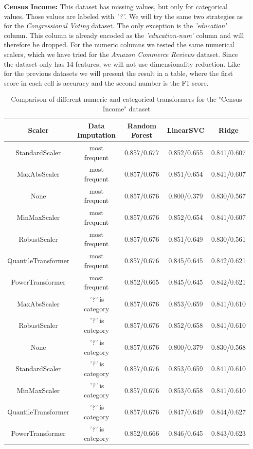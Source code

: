 \documentclass[a4paper,10pt]{article}
\begin{document}
\textbf{Census Income:} This dataset has missing values, but only for categorical values.
 Those values are labeled with \textit{'?'}. We will try the same two strategies as for the \textit{Congressional Voting} dataset.
 The only exception is the \textit{'education'} column. This column is already encoded as the
 \textit{'education-num'} column and will therefore be dropped. For the numeric columns 
 we tested the same numerical scalers, which we have tried for the 
 \textit{Amazon Commerce Reviews} dataset. Since the dataset only has 14 features,
we will not use dimensionality reduction. Like for the previous
datasets we will present the result in a table, where the first score in each cell is accuracy and the second
number is the F1 score.

\begin{table}[h!]
\centering
\small
\begin{tabular}{|c|c|c|c|c|}
\hline
\textbf{Scaler} & \textsf{Data Imputation} & \textbf{Random Forest} & \textbf{LinearSVC} & \textbf{Ridge} \\
\hline
StandardScaler & most frequent & \cellcolor[HTML]{C1E1C1}0.857/0.677 & 0.852/0.655 & 0.841/0.607 \\
\hline
MaxAbsScaler & most frequent & 0.857/0.676 & 0.851/0.654 & 0.841/0.607 \\
\hline
None & most frequent & 0.857/0.676 & 0.800/0.379 & 0.830/0.567 \\
\hline
MinMaxScaler & most frequent & 0.857/0.676 & 0.852/0.654 & 0.841/0.607 \\
\hline
RobustScaler & most frequent & 0.857/0.676 & 0.851/0.649 & 0.830/0.561 \\
\hline
QuantileTransformer & most frequent & 0.857/0.676 & 0.845/0.645 & 0.842/0.621 \\
\hline
PowerTransformer & most frequent & 0.852/0.665 & 0.845/0.645 & 0.842/0.621 \\
\hline
MaxAbsScaler & \textit{'?'} is category & 0.857/0.676 & 0.853/0.659 & 0.841/0.610 \\
\hline
RobustScaler & \textit{'?'} is category & 0.857/0.676 & 0.852/0.658 & 0.841/0.610 \\
\hline
None & \textit{'?'} is category & 0.857/0.676 & 0.800/0.379 & 0.830/0.568 \\
\hline
StandardScaler & \textit{'?'} is category & 0.857/0.676 & \cellcolor[HTML]{C1E1C1}0.853/0.659 & 0.841/0.610 \\
\hline
MinMaxScaler & \textit{'?'} is category & 0.857/0.676 & 0.853/0.658 & 0.841/0.610 \\
\hline
QuantileTransformer & \textit{'?'} is category & 0.857/0.676 & 0.847/0.649 & \cellcolor[HTML]{C1E1C1}0.844/0.627 \\
\hline
PowerTransformer & \textit{'?'} is category & 0.852/0.666 & 0.846/0.645 & 0.843/0.623 \\
\hline
\end{tabular}
\caption{Comparison of different numeric and categorical transformers for the "Census Income" dataset}
\label{table:censustransformers}
\end{table}
\end{document}
